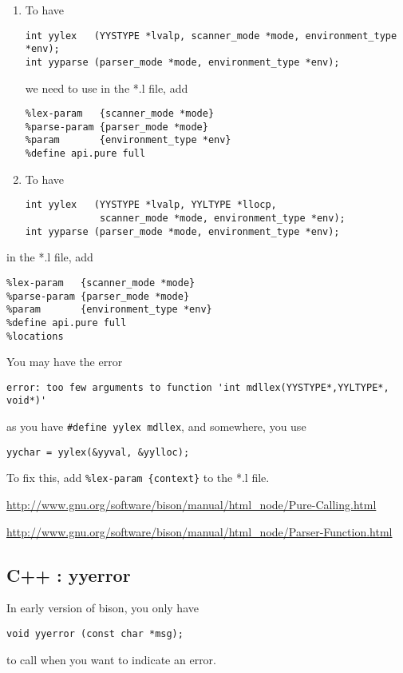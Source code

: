 \begin{enumerate}
  \item To have
\begin{verbatim}
int yylex   (YYSTYPE *lvalp, scanner_mode *mode, environment_type *env);
int yyparse (parser_mode *mode, environment_type *env);
\end{verbatim}  
we need to use 
in the *.l file, add
\begin{verbatim}
%lex-param   {scanner_mode *mode}
%parse-param {parser_mode *mode}
%param       {environment_type *env}
%define api.pure full
\end{verbatim}

  \item To have
\begin{verbatim}
int yylex   (YYSTYPE *lvalp, YYLTYPE *llocp,
             scanner_mode *mode, environment_type *env);
int yyparse (parser_mode *mode, environment_type *env);
\end{verbatim}
\end{enumerate}
in the *.l file, add
\begin{verbatim}
%lex-param   {scanner_mode *mode}
%parse-param {parser_mode *mode}
%param       {environment_type *env}
%define api.pure full
%locations
\end{verbatim}


You may have the error
\begin{verbatim}
error: too few arguments to function 'int mdllex(YYSTYPE*,YYLTYPE*, void*)'
\end{verbatim}
as you have \verb!#define yylex mdllex!, 
and somewhere, you use
\begin{verbatim}
yychar = yylex(&yyval, &yylloc);
\end{verbatim}
To fix this, add \verb!%lex-param {context}! to the *.l file.

\url{http://www.gnu.org/software/bison/manual/html_node/Pure-Calling.html}

\url{http://www.gnu.org/software/bison/manual/html_node/Parser-Function.html}

\subsection{C++ : yyerror}

In early version of bison, you only have
\begin{verbatim}
void yyerror (const char *msg);
\end{verbatim}
to call when you want to indicate an error.

